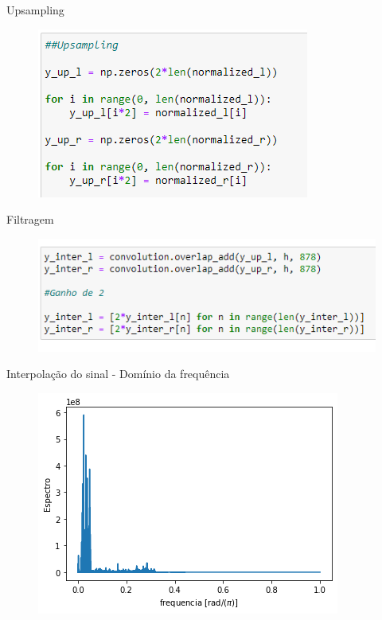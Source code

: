 \documentclass{beamer}
\begin{document}
\begin{frame}{Upsampling}
    \begin{figure}
        \centering
        \includegraphics[scale = 1.0]{upsampling.png}
    \end{figure}
\end{frame}

\begin{frame}{Filtragem}
    \begin{figure}
        \centering
        \includegraphics[scale = 1.0]{filtrage.png}
    \end{figure}
\end{frame}
\begin{frame}{Interpolação do sinal - Domínio da frequência}
   \begin{figure}
        \centering
        \includegraphics[scale = .8]{interpol1.png}
    \end{figure}
\end{frame}
\end{document}
